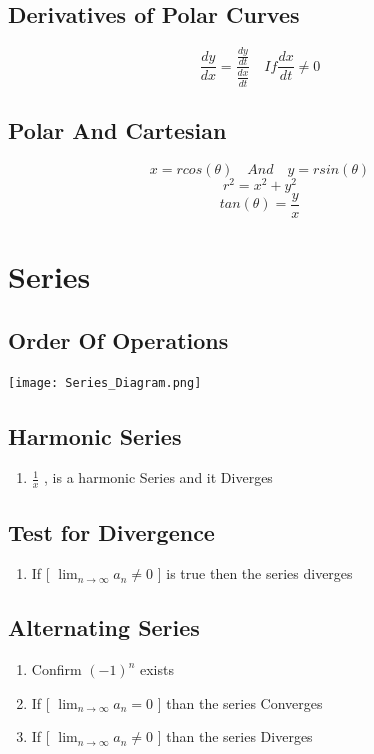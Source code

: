 \documentclass[12pt]{article}
\begin{document}
\subsection{Derivatives of Polar Curves}
\[
	\frac{dy}{dx} = \frac{ \frac{dy}{dt} }{ \frac{dx}{dt} } \quad If \frac{dx}{dt} \neq 0
\]

\subsection{Polar And Cartesian}

\[
	x = r cos(\theta) \quad And \quad y = r sin(\theta)
\]
\[
	r^{2} = x^{2} + y^{2}
\]
\[
	tan(\theta) = \frac{y}{x}
\]

\pagebreak


\section{Series}

\subsection{Order Of Operations}
\texttt{[image: Series\_Diagram.png]}


\subsection{Harmonic Series}

\begin{enumerate}
\item $\frac{1}{x}$ , is a harmonic Series and it Diverges
\end{enumerate}


\subsection{Test for Divergence}

\begin{enumerate}
\item If [ $\lim_{n\rightarrow \infty} a_n \neq 0$ ] is true then the series diverges
\end{enumerate}


\subsection{Alternating Series}

\begin{enumerate}
\item Confirm $\left( -1 \right) ^{n} $ exists
\item If [ $\lim_{n\rightarrow \infty} a_n = 0$ ] than the series Converges
\item If [ $\lim_{n\rightarrow \infty} a_n \neq 0$ ] than the series Diverges
\end{enumerate}
\end{document}

